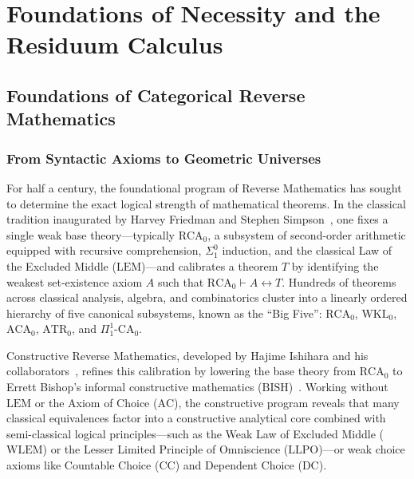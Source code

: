 \part{Foundations of Necessity and the Residuum Calculus}

\chapter{Foundations of Categorical Reverse Mathematics}

\label{ch:foundations}

\section{From Syntactic Axioms to Geometric Universes}

For half a century, the foundational program of Reverse Mathematics has sought to determine the exact logical strength of mathematical theorems. In the classical tradition inaugurated by Harvey Friedman and Stephen Simpson~\cite{Friedman75,Simpson09}, one fixes a single weak base theory---typically $\mathrm{RCA}_0$, a subsystem of second-order arithmetic equipped with recursive comprehension, $\Sigma^0_1$ induction, and the classical Law of the Excluded Middle ($\mathrm{LEM}$)---and calibrates a theorem $T$ by identifying the weakest set-existence axiom $A$ such that $\mathrm{RCA}_0 \vdash A \leftrightarrow T$. Hundreds of theorems across classical analysis, algebra, and combinatorics cluster into a linearly ordered hierarchy of five canonical subsystems, known as the ``Big Five'': $\mathrm{RCA}_0$, $\mathrm{WKL}_0$, $\mathrm{ACA}_0$, $\mathrm{ATR}_0$, and $\Pi^1_1\text{-}\mathrm{CA}_0$.

Constructive Reverse Mathematics, developed by Hajime Ishihara and his collaborators~\cite{Ishihara06}, refines this calibration by lowering the base theory from $\mathrm{RCA}_0$ to Errett Bishop's informal constructive mathematics ($\mathrm{BISH}$)~\cite{Bishop67}. Working without $\mathrm{LEM}$ or the Axiom of Choice ($\mathrm{AC}$), the constructive program reveals that many classical equivalences factor into a constructive analytical core combined with semi-classical logical principles---such as the Weak Law of Excluded Middle ($\mathrm{WLEM}$) or the Lesser Limited Principle of Omniscience ($\mathrm{LLPO}$)---or weak choice axioms like Countable Choice ($\mathrm{CC}$) and Dependent Choice ($\mathrm{DC}$).

